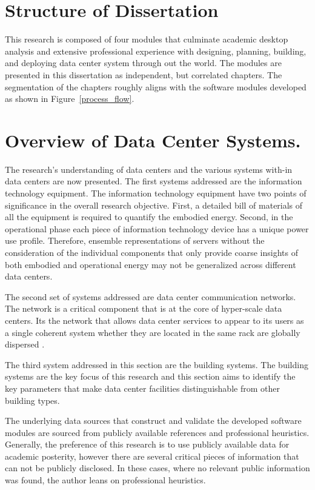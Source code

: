\section{Structure of Dissertation}

    This research is composed of four modules that culminate academic desktop analysis and extensive professional experience with designing, planning, building, and deploying data center system through out the world. The modules are presented in this dissertation as independent, but correlated chapters. The segmentation of the chapters roughly aligns with the software modules developed as shown in Figure~\ref{process_flow}.
    
    

\section{Overview of Data Center Systems.}
    The research's understanding of data centers and the various systems with-in data centers are now presented. The first systems addressed are the information technology equipment. The information technology equipment have two points of significance in the overall research objective. First, a detailed bill of materials of all the equipment is required to quantify the embodied energy. Second, in the operational phase each piece of information technology device has a unique power use profile. Therefore, ensemble representations of servers without the consideration of the individual components that only provide coarse insights of both embodied and operational energy may not be generalized across different data centers. 
    
    The second set of systems addressed are data center communication networks. The network is a critical component that is at the core of hyper-scale data centers. Its the network that allows data center services to appear to its users as a single coherent system whether they are located in the same rack are globally dispersed \cite{steen17}.
    
    The third system addressed in this section are the building systems. The building systems are the key focus of this research and this section aims to identify the key parameters that make data center facilities distinguishable from other building types. 
    
    The underlying data sources that construct and validate the developed software modules are sourced from publicly available references and professional heuristics. Generally, the preference of this research is to use publicly available data for academic posterity, however there are several critical pieces of information that can not be publicly disclosed. In these cases, where no relevant public information was found, the author leans on professional heuristics. 
    
